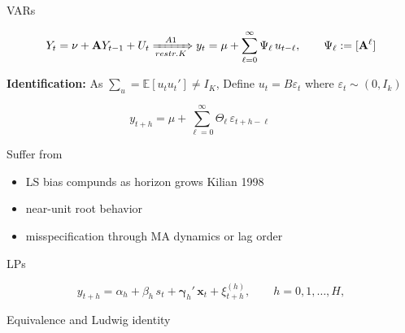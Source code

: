 
\begin{frame}{VARs}

\begin{equation}
    Y_t =\mathbf{\nu} + \mathbf{A} Y_{t-1} + U_t \xRightarrow[restr. K]{A1}  y_t = \mu + \sum_{\ell=0}^{\infty} \Psi_\ell\, u_{t-\ell},
\qquad \Psi_\ell := [\mathbf{A}^\ell]
\end{equation}

\textbf{Identification:} As $\sum_u = \mathbb{E}[u_tu_t'] \neq I_K$, Define $u_t=B\varepsilon_t$ where $\varepsilon_t \sim (0, I_k)$


\begin{equation}
    y_{t+h} = \mu + \sum_{\ell=0}^{\infty} \Theta_\ell\, \varepsilon_{t+h-\ell} \qquad 
    \label{eq:sma_forward}
\end{equation}

Suffer from
\begin{itemize}
    \item LS bias compunds as horizon grows Kilian 1998 
    \item near-unit root behavior 
    \item misspecification through MA dynamics or lag order
\end{itemize}
\end{frame}

\begin{frame}{LPs}

    \begin{equation}
    y_{t+h} = \alpha_h + \beta_h\, s_t
            + \boldsymbol{\gamma}_h'\, \mathbf{x}_t
            + \xi_{t+h}^{(h)},
    \qquad h = 0, 1, \ldots, H,
    \label{eq:lp_shock}
\end{equation}
    
\end{frame}

\begin{frame}{Equivalence and Ludwig identity}


\end{frame}